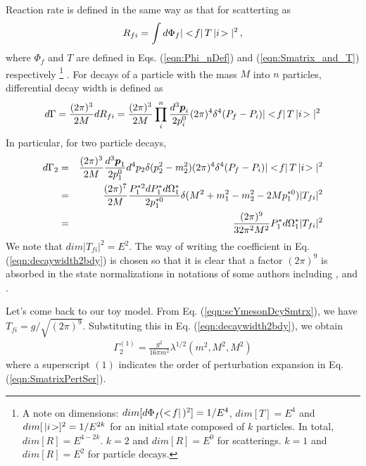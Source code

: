 Reaction rate is defined in the same way as that for scatterting as
\begin{eqnarray}
R_{fi} = \int d\Phi_f | <\! f |\, T \,| i \!> |^2\,,
\end{eqnarray}
where $\Phi_f$ and $T$ are defined in Eqs. (\ref{eqn:Phi_nDef}) and (\ref{eqn:Smatrix_and_T})
respectively
\footnote{
A note on dimensions: $dim[ d\Phi_f (<\! f |\, )^2] = 1/E^4$,
$dim [T] = E^4$ and $dim [\,| i \!>]^2 = 1/E^{2k}$ for an initial state
composed of $k$ particles. In total, $dim[R] = E^{4 - 2k}$. 
$k = 2$ and $dim[R] = E^0$ for scatterings. $k = 1$ and $dim[R] = E^2$
for particle decays.
} %
.
For decays of a particle with the mass $M$ into $n$ particles, differential decay width 
is defined as
\begin{eqnarray}
d \Gamma = \frac{(2\pi)^3}{2M} dR_{fi}
=
\frac{(2\pi)^3}{2M} 
\prod_i^n \frac{d^3\mbox{\boldmath $p$}_i}{2p_i^0} (2\pi)^4 \delta^4(P_f - P_i) 
 | <\! f |\, T \,| i \!> |^2
\end{eqnarray}
In particular, for two particle decays,
\begin{eqnarray}
d \Gamma_2 
&=&
\frac{(2\pi)^3}{2M} 
\frac{d^3\mbox{\boldmath $p$}_1}{2p_1^0} 
d^4 p_2 \delta(p_2^2 - m_2^2)
(2\pi)^4 \delta^4(P_f - P_i) 
 | <\! f |\, T \,| i \!> |^2
\nonumber\\
&=&
\frac{(2\pi)^7}{2M} 
\frac{P_1^{*2} dP_1^* d \Omega_1^*}{2p_1^{*0}} 
\delta(M^2 + m_1^2  - m_2^2 - 2 M p_1^{*0})
|T_{fi}|^2
\nonumber\\
&=&
\frac{(2\pi)^9}{32\pi^2M^2} 
P_1^{*}  d \Omega_1^*
|T_{fi}|^2
\label{eqn:decaywidth2bdy}
\end{eqnarray}
We note that $dim |T_{fi}|^2 = E^2$.
The way of writing the coefficient in Eq. (\ref{eqn:decaywidth2bdy}) is chosen
so that it is clear that a factor $(2\pi)^9$ is absorbed in the state normalizations
in notations of some authors including \cite{ref:Donnachie}, \cite{ref:Collins} and
\cite{ref:Itzykson-Zuber}.

Let's come back to our toy model. From Eq. (\ref{eqn:scYmesonDcySmtrx}),
we have $T_{fi} = g / \sqrt{(2\pi)^9}$. Substituting this in Eq. (\ref{eqn:decaywidth2bdy}),
we obtain
\begin{eqnarray}
\Gamma_2^{(1)} = 
\frac{g^2}{16\pi m^2} \lambda^{1/2}(m^2, M^2, M^2)
\end{eqnarray}
where a superscript $(1)$ indicates the order of perturbation expansion in Eq.  (\ref{eqn:SmatrixPertSer}).


